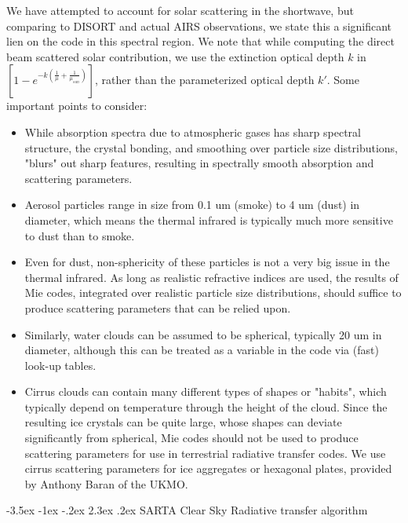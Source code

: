\documentclass[11pt]{article}
\makeatletter
\renewcommand{\section}{\@startsection {section}{1}{\z@}%
                                   {-3.5ex \@plus -1ex \@minus -.2ex}%
                                   {2.3ex \@plus.2ex}%
                                   {\reset@font\large\bfseries}}
\makeatother
\begin{document}
We have attempted to account for solar scattering in the shortwave,
but comparing to DISORT and actual AIRS observations, we state this a
significant lien on the code in this spectral region.  We note that
while computing the direct beam scattered solar contribution, we use
the extinction optical depth $k$ in $ \left[ 1 - e^{-k (\frac{1}{\mu}
    + \frac{1}{\mu_{sun}})} \right]$, rather than the parameterized
optical depth $k \prime$.
Some important points to consider:

\begin{itemize}
\item While absorption spectra due to atmospheric gases has sharp
  spectral structure, the crystal bonding, and smoothing over particle
  size distributions, "blurs" out sharp features, resulting in
  spectrally smooth absorption and scattering parameters.
\item Aerosol particles range in size from 0.1 um (smoke) to 4 um
  (dust) in diameter, which means the thermal infrared is typically
  much more sensitive to dust than to smoke.
\item Even for dust, non-sphericity of these particles is not a very
  big issue in the thermal infrared.  As long as realistic refractive
  indices are used, the results of Mie codes, integrated over
  realistic particle size distributions, should suffice to produce
  scattering parameters that can be relied upon.
\item Similarly, water clouds can be assumed to be spherical,
  typically 20 um in diameter, although this can be treated as a
  variable in the code via (fast) look-up tables.
\item Cirrus clouds can contain many different types of shapes or
  "habits", which typically depend on temperature through the height
  of the cloud. Since the resulting ice crystals can be quite large,
  whose shapes can deviate significantly from spherical, Mie codes
  should not be used to produce scattering parameters for use in
  terrestrial radiative transfer codes.  We use cirrus scattering
  parameters for ice aggregates or hexagonal plates, provided by
  Anthony Baran of the UKMO.
\end{itemize}

\section{SARTA Clear Sky Radiative transfer algorithm}
\end{document}
